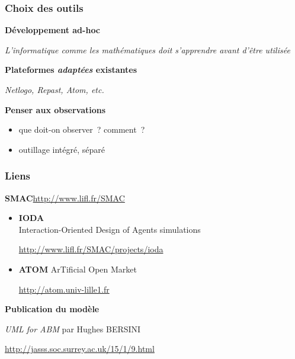 \documentclass{beamer}
\begin{document}

\begin{frame}
  \frametitle{Choix des outils}
  
  \textbf{Développement ad-hoc}

  {\small\slshape L'informatique comme les mathématiques doit s'apprendre avant d'être utilisée}

  \vfill
  
  \textbf{Plateformes \emph{adaptées} existantes}

  {\small\slshape Netlogo, Repast, Atom, etc.}

  \vfill

  \textbf{Penser aux observations}

  {\small\slshape
    \begin{itemize}
    \item que doit-on observer~? comment~?
    \item outillage intégré, séparé
    \end{itemize}
  }
\end{frame}
  

\begin{frame}
  \frametitle{Liens}

  \textbf{SMAC}{\hfill\footnotesize\url{http://www.lifl.fr/SMAC}}

  \vfill

  \begin{itemize}
  \item \textbf{IODA}\\
    Interaction-Oriented Design of Agents simulations

    {\null\hfill\footnotesize\url{http://www.lifl.fr/SMAC/projects/ioda}}

  \vfill

  \item \textbf{ATOM} ArTificial Open Market

    {\null\hfill\footnotesize\url{http://atom.univ-lille1.fr}}
  \end{itemize}

  \vfill

  \textbf{Publication du modèle}

  \vfill

  \emph{UML for ABM} par Hughes BERSINI
  
  {\null\hfill\footnotesize\url{http://jasss.soc.surrey.ac.uk/15/1/9.html}}
\end{frame}
\end{document}
